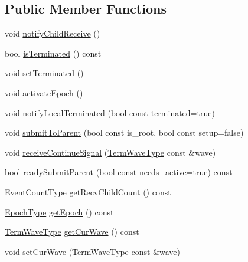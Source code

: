\subsection*{Public Member Functions}
\begin{DoxyCompactItemize}
\item 
void \hyperlink{structvt_1_1term_1_1_term_state_a15191c2002809d73cd7f6d4c1a22b480}{notify\+Child\+Receive} ()
\item 
bool \hyperlink{structvt_1_1term_1_1_term_state_a3effc7cc47eb94edac12091aea044b02}{is\+Terminated} () const
\item 
void \hyperlink{structvt_1_1term_1_1_term_state_abcf1c80b28edf803367d9c047fd52bf7}{set\+Terminated} ()
\item 
void \hyperlink{structvt_1_1term_1_1_term_state_af18ed55a5c5b685b655e84aabd4d3d9c}{activate\+Epoch} ()
\item 
void \hyperlink{structvt_1_1term_1_1_term_state_a6b18d41b5a88a20e5231c236c996cfff}{notify\+Local\+Terminated} (bool const terminated=true)
\item 
void \hyperlink{structvt_1_1term_1_1_term_state_a3419f0c92e9b3d1ba7665f46c88f5526}{submit\+To\+Parent} (bool const is\+\_\+root, bool const setup=false)
\item 
void \hyperlink{structvt_1_1term_1_1_term_state_a9bf44783fc04e0e27056dfdc5eb0bc5a}{receive\+Continue\+Signal} (\hyperlink{namespacevt_1_1term_a4af17606966b2b5a6cba523bc39095a3}{Term\+Wave\+Type} const \&wave)
\item 
bool \hyperlink{structvt_1_1term_1_1_term_state_ac894c13192b87b7bbb467b4ddaa8a182}{ready\+Submit\+Parent} (bool const needs\+\_\+active=true) const
\item 
\hyperlink{structvt_1_1term_1_1_term_state_a900fe4e9d98c81a320ae1dca27b71c2c}{Event\+Count\+Type} \hyperlink{structvt_1_1term_1_1_term_state_a9d9eb29f1af45d4287b9535f33f14363}{get\+Recv\+Child\+Count} () const
\item 
\hyperlink{namespacevt_a985a5adf291c34a3ca263b3378388236}{Epoch\+Type} \hyperlink{structvt_1_1term_1_1_term_state_a081ea661cb484ab14804dcd027a2d136}{get\+Epoch} () const
\item 
\hyperlink{namespacevt_1_1term_a4af17606966b2b5a6cba523bc39095a3}{Term\+Wave\+Type} \hyperlink{structvt_1_1term_1_1_term_state_a240b60d4d683179af84ab72e5d2092e9}{get\+Cur\+Wave} () const
\item 
void \hyperlink{structvt_1_1term_1_1_term_state_ac2ec8452c3f502107c79a17d8c9c75b7}{set\+Cur\+Wave} (\hyperlink{namespacevt_1_1term_a4af17606966b2b5a6cba523bc39095a3}{Term\+Wave\+Type} const \&wave)

\end{DoxyCompactItemize}
